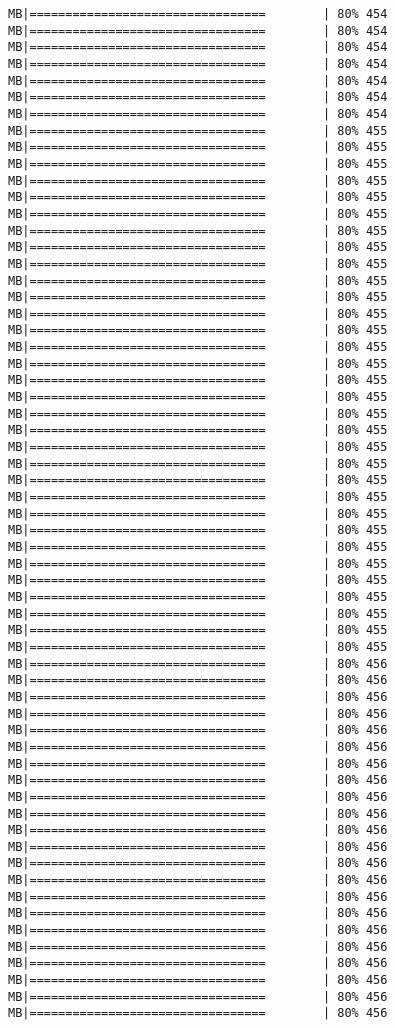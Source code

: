 \documentclass[
]{article}
\begin{document}
\begin{verbatim}
MB|=================================        | 80% 454 MB|=================================        | 80% 454 MB|=================================        | 80% 454 MB|=================================        | 80% 454 MB|=================================        | 80% 454 MB|=================================        | 80% 454 MB|=================================        | 80% 454 MB|=================================        | 80% 455 MB|=================================        | 80% 455 MB|=================================        | 80% 455 MB|=================================        | 80% 455 MB|=================================        | 80% 455 MB|=================================        | 80% 455 MB|=================================        | 80% 455 MB|=================================        | 80% 455 MB|=================================        | 80% 455 MB|=================================        | 80% 455 MB|=================================        | 80% 455 MB|=================================        | 80% 455 MB|=================================        | 80% 455 MB|=================================        | 80% 455 MB|=================================        | 80% 455 MB|=================================        | 80% 455 MB|=================================        | 80% 455 MB|=================================        | 80% 455 MB|=================================        | 80% 455 MB|=================================        | 80% 455 MB|=================================        | 80% 455 MB|=================================        | 80% 455 MB|=================================        | 80% 455 MB|=================================        | 80% 455 MB|=================================        | 80% 455 MB|=================================        | 80% 455 MB|=================================        | 80% 455 MB|=================================        | 80% 455 MB|=================================        | 80% 455 MB|=================================        | 80% 455 MB|=================================        | 80% 455 MB|=================================        | 80% 455 MB|=================================        | 80% 456 MB|=================================        | 80% 456 MB|=================================        | 80% 456 MB|=================================        | 80% 456 MB|=================================        | 80% 456 MB|=================================        | 80% 456 MB|=================================        | 80% 456 MB|=================================        | 80% 456 MB|=================================        | 80% 456 MB|=================================        | 80% 456 MB|=================================        | 80% 456 MB|=================================        | 80% 456 MB|=================================        | 80% 456 MB|=================================        | 80% 456 MB|=================================        | 80% 456 MB|=================================        | 80% 456 MB|=================================        | 80% 456 MB|=================================        | 80% 456 MB|=================================        | 80% 456 MB|=================================        | 80% 456 MB|=================================        | 80% 456 MB|=================================        | 80% 456 
\end{verbatim}
\end{document}
